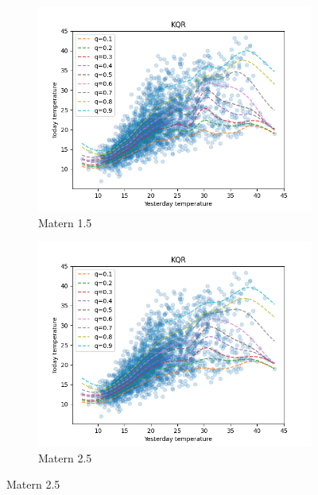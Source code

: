 \begin{figure}[!h]
\begin{subfigure}[b]{0.5\linewidth}
    \end{subfigure} 
    \begin{subfigure}[b]{0.5\linewidth}
        \centering
        \includegraphics[width=1.1\textwidth]{images/melbourne_matern_1.5_kernel_quantile_regression.png} 
        \caption{Matern 1.5} 
        \label{} 
        \vspace{4ex}
    \end{subfigure}%
    \begin{subfigure}[b]{0.5\linewidth}
        \centering
        \includegraphics[width=1.1\textwidth]{images/melbourne_matern_2.5_kernel_quantile_regression.png}
        \caption{Matern 2.5} 
        \label{} 
        \vspace{4ex}

\end{subfigure}
\end{figure}
